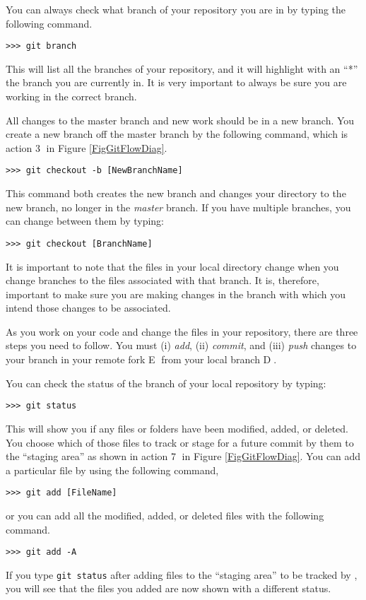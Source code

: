     You can always check what branch of your repository you are in by typing the following command.
    \begin{lstlisting}[frame=single]
      >>> git branch
    \end{lstlisting}
    This will list all the branches of your repository, and it will highlight with an ``*'' the branch you are currently in. It is very important to always be sure you are working in the correct branch.

    All changes to the master branch and new work should be in a new branch. You create a new branch off the master branch by the following command, which is action \textcircled{3} in Figure \ref{FigGitFlowDiag}.
    \begin{lstlisting}[frame=single]
      >>> git checkout -b [NewBranchName]
    \end{lstlisting}
    This command both creates the new branch and changes your directory to the new branch, no longer in the \textit{master} branch. If you have multiple branches, you can change between them by typing:
    \begin{lstlisting}[frame=single]
      >>> git checkout [BranchName]
    \end{lstlisting}
    It is important to note that the files in your local \git directory change when you change branches to the files associated with that branch. It is, therefore, important to make sure you are making changes in the branch with which you intend those changes to be associated.

    As you work on your code and change the files in your repository, there are three steps you need to follow. You must (i) \textit{add}, (ii) \textit{commit}, and (iii) \textit{push} changes to your branch in your remote fork \textcircled{E} from your local branch \textcircled{D}.

    You can check the status of the branch of your local repository by typing:
    \begin{lstlisting}[frame=single]
      >>> git status
    \end{lstlisting}
    This will show you if any files or folders have been modified, added, or deleted. You choose which of those files to track or stage for a future commit by  them to the ``staging area'' as shown in action \textcircled{7} in Figure \ref{FigGitFlowDiag}. You can add a particular file by using the following command,
    \begin{lstlisting}[frame=single]
      >>> git add [FileName]
    \end{lstlisting}
    or you can add all the modified, added, or deleted files with the following command.
    \begin{lstlisting}[frame=single]
      >>> git add -A
    \end{lstlisting}
    If you type \texttt{git status} after adding files to the ``staging area'' to be tracked by \git, you will see that the files you added are now shown with a different status.

